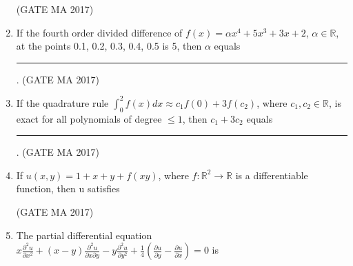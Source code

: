 \documentclass[journal,12pt,onecolumn]{IEEEtran}
\theoremstyle{remark}
\begin{document}
\begin{enumerate}
\begin{enumerate}
\end{enumerate}
\hfill (GATE MA 2017)
\item
If the fourth order divided difference of $f(x) = \alpha x^4 + 5x^3 + 3x + 2$, $\alpha \in \mathbb{R}$, at the points 0.1, 0.2, 0.3, 0.4, 0.5 is 5, then $\alpha$ equals \rule{1.5cm}{0.4pt}.
\hfill (GATE MA 2017)
\item
If the quadrature rule $\int_0^2 f(x) dx \approx c_1 f(0) + 3f(c_2)$, where $c_1, c_2 \in \mathbb{R}$, is exact for all polynomials of degree $\le 1$, then $c_1 + 3c_2$ equals \rule{1.5cm}{0.4pt}.
\hfill (GATE MA 2017)
\item
If $u(x,y) = 1+x+y+f(xy)$, where $f: \mathbb{R}^2 \to \mathbb{R}$ is a differentiable function, then u satisfies
\begin{enumerate}
\end{enumerate}
\hfill (GATE MA 2017)
\item
The partial differential equation $x\frac{\partial^2 u}{\partial x^2} + (x-y)\frac{\partial^2 u}{\partial x \partial y} - y\frac{\partial^2 u}{\partial y^2} + \frac{1}{4}\left(\frac{\partial u}{\partial y} - \frac{\partial u}{\partial x}\right) = 0$ is
\begin{enumerate}
\end{enumerate}
\end{enumerate}
\end{document}
